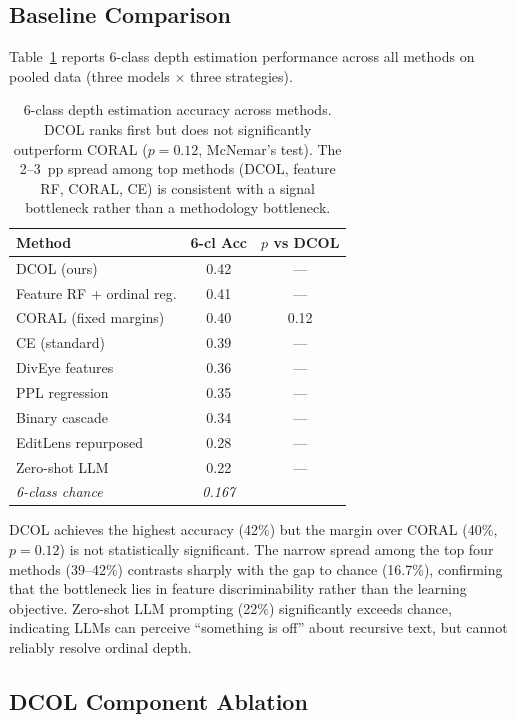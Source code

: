 \documentclass[11pt,a4paper]{article}
\begin{document}
\subsection{Baseline Comparison}

Table~\ref{tab:baselines} reports 6-class depth estimation performance across all methods on pooled data (three models $\times$ three strategies).

\begin{table}[t]
\centering
\small
\begin{tabular}{lcc}
\toprule
\textbf{Method} & \textbf{6-cl Acc} & \textbf{$p$ vs DCOL} \\
\midrule
DCOL (ours) & 0.42 & --- \\
Feature RF + ordinal reg. & 0.41 & --- \\
CORAL (fixed margins) & 0.40 & 0.12 \\
CE (standard) & 0.39 & --- \\
DivEye features & 0.36 & --- \\
PPL regression & 0.35 & --- \\
Binary cascade & 0.34 & --- \\
EditLens repurposed & 0.28 & --- \\
Zero-shot LLM & 0.22 & --- \\
\midrule
\emph{6-class chance} & \emph{0.167} & \\
\bottomrule
\end{tabular}
\caption{6-class depth estimation accuracy across methods. DCOL ranks first but does not significantly outperform CORAL ($p=0.12$, McNemar's test). The 2--3~pp spread among top methods (DCOL, feature RF, CORAL, CE) is consistent with a signal bottleneck rather than a methodology bottleneck.}
\label{tab:baselines}
\end{table}

DCOL achieves the highest accuracy (42\%) but the margin over CORAL (40\%, $p=0.12$) is not statistically significant.
The narrow spread among the top four methods (39--42\%) contrasts sharply with the gap to chance (16.7\%), confirming that the bottleneck lies in feature discriminability rather than the learning objective.
Zero-shot LLM prompting (22\%) significantly exceeds chance, indicating LLMs can perceive ``something is off'' about recursive text, but cannot reliably resolve ordinal depth.

\subsection{DCOL Component Ablation}
\end{document}
